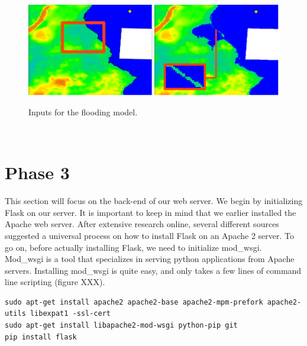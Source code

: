 \begin{figure}[h!]
\centering
	{\includegraphics[width=\linewidth]{gfx/Phase_2/problem4.png}}
\caption{Inputs for the flooding model.}
\label{fig:phase2_prob4}
\end{figure}\\

\section{Phase 3}
This section will focus on the back-end of our web server. We begin by initializing Flask on our server. It is important to keep in mind that we earlier installed the Apache web server. After extensive research online, several different sources suggested a universal process on how to install Flask on an Apache 2 server. To go on, before actually installing Flask, we need to initialize mod\_wsgi. Mod\_wsgi is a tool that specializes in serving python applications from Apache servers. Installing mod\_wsgi is quite easy, and only takes a few lines of command line scripting (figure XXX).\\

\begin{lstlisting}
sudo apt-get install apache2 apache2-base apache2-mpm-prefork apache2-utils libexpat1 -ssl-cert
sudo apt-get install libapache2-mod-wsgi python-pip git
pip install flask
\end{lstlisting}\\

